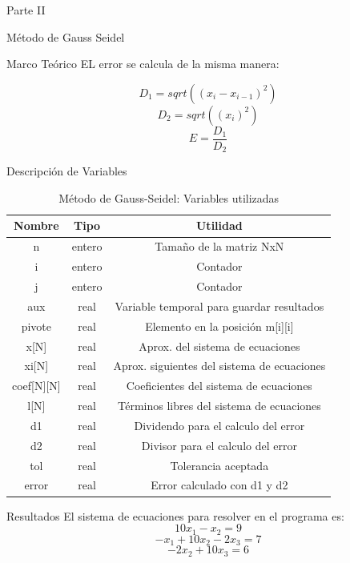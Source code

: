\documentclass[legalpaper, 12pt]{article}
\begin{document}
\begin{section}{Parte II}
\begin{subsection}{Método de Gauss Seidel}
\begin{subsubsection}{Marco Teórico}
        EL error se calcula de la misma manera:

        \[D_1 = sqrt((x_i-x_{i-1})^2)\]
        \[D_2 = sqrt((x_i)^2)\]
        \[E = \frac{D_1}{D_2}\]
      \end{subsubsection}
      \begin{subsubsection}{Descripción de Variables}
        \begin{table}[h]
          \centering
          \begin{tabular}{|c c c|}
            \hline
            Nombre & Tipo & Utilidad\\
            \hline\hline
            n & entero & Tamaño de la matriz NxN\\
            i & entero & Contador \\
            j & entero & Contador \\
            aux & real & Variable temporal para guardar resultados\\
            pivote & real & Elemento en la posición m[i][i] \\
            x[N] & real & Aprox. del sistema de ecuaciones \\
            xi[N] & real & Aprox. siguientes del sistema de ecuaciones \\
            coef[N][N] & real & Coeficientes del sistema de ecuaciones \\
            l[N] & real & Términos libres del sistema de ecuaciones \\
            d1 & real & Dividendo para el calculo del error\\
            d2 & real & Divisor para el calculo del error\\
            tol & real & Tolerancia aceptada\\
            error & real & Error calculado con d1 y d2\\
            \hline
          \end{tabular}
          \caption{Método de Gauss-Seidel: Variables utilizadas}
        \end{table}
      \end{subsubsection}
      \newpage
      \begin{subsubsection}{Resultados}
        El sistema de ecuaciones para resolver en el programa es:
        \[10x_1-x_2=9\]
        \[-x_1+10x_2-2x_3=7\]
        \[-2x_2+10x_3=6\]


\end{subsubsection}
\end{subsection}
\end{section}
\end{document}
